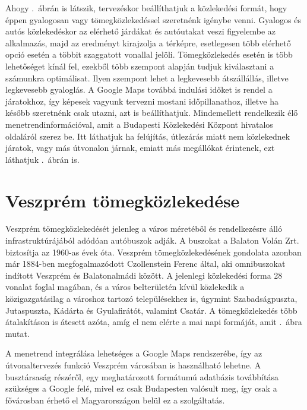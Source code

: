 Ahogy .\ ábrán is látszik, tervezéskor beállíthatjuk a közlekedési formát, hogy éppen gyalogosan vagy tömegközlekedéssel szeretnénk igénybe venni. 
Gyalogos és autós közlekedéskor az elérhető járdákat és autóutakat veszi figyelembe az alkalmazás, majd az eredményt kirajzolja a térképre, esetlegesen több elérhető opció esetén a többit szaggatott vonallal jelöli. 
Tömegközlekedés esetén is több lehetőséget kínál fel, ezekből több szempont alapján tudjuk kiválasztani a számunkra optimálisat. 
Ilyen szempont lehet a legkevesebb átszállállás, illetve legkevesebb gyaloglás. 
A Google Maps továbbá indulási időket is rendel a járatokhoz, így képesek vagyunk tervezni mostani időpillanathoz, illetve ha később szeretnénk csak utazni, azt is beállíthatjuk. 
Mindemellett rendelkezik élő menetrendinformációval, amit a Budapesti Közlekedési Központ hivatalos oldaláról szerez be. 
Itt láthatjuk ha felújítás, útlezárás miatt nem közlekednek járatok, vagy más útvonalon járnak, emiatt más megállókat érintenek, ezt láthatjuk .\ ábrán is. 



\section{Veszprém tömegközlekedése}
\label{veszpremtomeg}

Veszprém tömegközlekedését jelenleg a város méretéből és rendelkezésre álló infrastruktúrájából adódóan autóbuszok adják. 
A buszokat a Balaton Volán Zrt. biztosítja az 1960-as évek óta. 
Veszprém tömegközlekedésének gondolata azonban már 1884-ben megfogalmazódott Czollenstein Ferenc által, aki omnibuszokat indított Veszprém és Balatonalmádi között. 
A jelenlegi közlekedési forma 28 vonalat foglal magában, és a város belterületén kívül közlekedik a közigazgatásilag a városhoz tartozó településekhez is, úgymint  Szabadságpuszta, Jutaspuszta, Kádárta és Gyulafirátót, valamint Csatár. 
A tömegközlekedés több átalakításon is átesett azóta, amíg el nem elérte a mai napi formáját, amit .\ ábra mutat.

A menetrend integrálása lehetséges a Google Maps rendszerébe, így az útvonaltervezés funkció Veszprém városában is használható lehetne. 
A busztársaság részéről, egy meghatározott formátumú adatbázis továbbítása szükséges a Google felé, mivel ez csak Budapesten valósult meg, így csak a fővárosban érhető el Magyarországon belül ez a szolgáltatás. 


